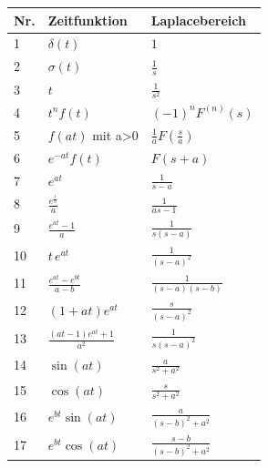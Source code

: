 \begin{table}
	\centering
	\begin{tabular}{|m{1cm}|m{5cm}|m{5cm}|} \hline
		\textbf{Nr.} & \textbf{Zeitfunktion} & \textbf{Laplacebereich}\\ \hline\hline
		1 & $\delta(t)$ & $1$\\\hline
		2 & $\sigma(t)$ & $\frac{1}{s}$\\\hline
		3 & $t$ & $\frac{1}{s^{2}}$\\\hline
		4 & $t^{n}f(t)$ & $(-1)^{n}F^(n)(s)$\\\hline
		5 & $f(at)$ mit a>0 & $\frac{1}{a}F(\frac{s}{a})$\\\hline
		6 & $e^{-at}f(t)$ & $F(s+a)$\\\hline
		7 & $e^{at}$ & $\frac{1}{s-a}$\\\hline
		8 & $\frac{e^{\frac{t}{a}}}{a}$ & $\frac{1}{as-1}$\\\hline
		9 & $\frac{e^{at}-1}{a}$ & $\frac{1}{s(s-a)}$\\\hline
		10 & $t\,e^{at}$ & $\frac{1}{(s-a)^{2}}$\\\hline
		11 & $\frac{e^{at}-e^{bt}}{a-b}$ & $\frac{1}{(s-a)(s-b)}$\\\hline
		12 & $(1+at)e^{at}$ & $\frac{s}{(s-a)^{2}}$\\\hline
		13 & $\frac{(at-1)e^{at}+1}{a^{2}}$ & $\frac{1}{s(s-a)^{2}}$\\\hline
		14 & $\sin(at)$ & $\frac{a}{s^{2}+a^{2}}$\\\hline
		15 & $\cos(at)$ & $\frac{s}{s^{2}+a^{2}}$\\\hline
		16 & $e^{bt}\sin(at)$ & $\frac{a}{(s-b)^{2}+a^{2}}$\\\hline
		17 & $e^{bt}\cos(at)$ & $\frac{s-b}{(s-b)^{2}+a^{2}}$\\\hline
	\end{tabular}
	\label{tab:GridSetupCigre}
\end{table}
%

